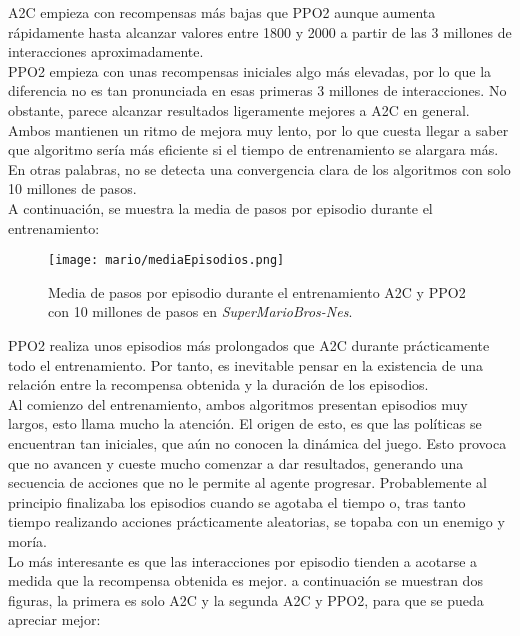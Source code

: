 \documentclass[11pt,fleqn]{book} %
\begin{document}
A2C empieza con recompensas más bajas que PPO2 aunque aumenta rápidamente hasta alcanzar valores entre 1800 y 2000 a partir de las 3 millones de interacciones aproximadamente.\\

PPO2 empieza con unas recompensas iniciales algo más elevadas, por lo que la diferencia no es tan pronunciada en esas primeras 3 millones de interacciones. No obstante, parece alcanzar resultados ligeramente mejores a A2C en general. Ambos mantienen un ritmo de mejora muy lento, por lo que cuesta llegar a saber que algoritmo sería más eficiente si el tiempo de entrenamiento se alargara más. En otras palabras, no se detecta una convergencia clara de los algoritmos con solo 10 millones de pasos. \\

A continuación, se muestra la media de pasos por episodio durante el entrenamiento:

\begin{figure}[H]
	\centering\texttt{[image: mario/mediaEpisodios.png]}
	\caption{Media de pasos por episodio durante el entrenamiento A2C y PPO2 con 10 millones de pasos en \textit{SuperMarioBros-Nes}.}
	\label{fig:marioepisodios} %
\end{figure}

PPO2 realiza unos episodios más prolongados que A2C durante prácticamente todo el entrenamiento. Por tanto, es inevitable pensar en la existencia de una relación entre la recompensa obtenida y la duración de los episodios. \\

Al comienzo del entrenamiento, ambos algoritmos presentan episodios muy largos, esto llama mucho la atención. El origen de esto, es que las políticas se encuentran tan iniciales, que aún no conocen la dinámica del juego. Esto provoca que no avancen y cueste mucho comenzar a dar resultados, generando una secuencia de acciones que no le permite al agente progresar. Probablemente al principio finalizaba los episodios cuando se agotaba el tiempo o, tras tanto tiempo realizando acciones prácticamente aleatorias, se topaba con un enemigo y moría. \\ 

Lo más interesante es que las interacciones por episodio tienden a acotarse a medida que la recompensa obtenida es mejor. a continuación se muestran dos figuras, la primera es solo A2C y la segunda A2C y PPO2, para que se pueda apreciar mejor:
\end{document}
